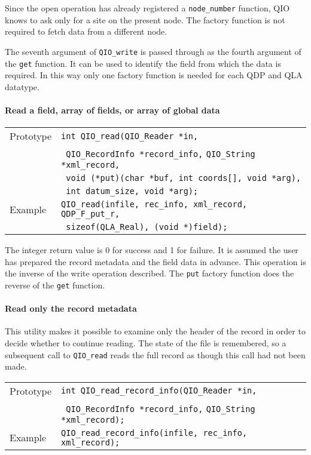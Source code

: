 \documentclass{article}
\newcommand{\QIOstring}{{\tt QIO\_String }}
\begin{document}
Since the open operation has already registered a \verb|node_number|
function, QIO knows to ask only for a site on the present node.  The
factory function is not required to fetch data from a different node.

The seventh argument of \verb|QIO_write| is passed through as the fourth
argument of the \verb|get| function.  It can be used to identify the
field from which the data is required.  In this way only one factory
function is needed for each QDP and QLA datatype.

\paragraph{Read a field, array of fields, or array of global data}

\begin{flushleft}
  \begin{tabular}{|l|l|}
  \hline
  Prototype      & \verb|int QIO_read(QIO_Reader *in,| \\
            & \verb| QIO_RecordInfo *record_info,| \QIOstring \verb|*xml_record, |\\
	    & \verb| void (*put)(char *buf, int coords[], void *arg), |\\
            & \verb| int datum_size, void *arg);| \\
\hline
  Example  & \verb|QIO_read(infile, rec_info, xml_record, QDP_F_put_r, |\\
           & \verb| sizeof(QLA_Real), (void *)field);|\\
   \hline
 \end{tabular}
\end{flushleft}
%
The integer return value is 0 for success and 1 for failure.  It is
assumed the user has prepared the record metadata and the field data
in advance.  This operation is the inverse of the write operation
described.  The \verb|put| factory function does the reverse of the
\verb|get| function.

\paragraph{Read only the record metadata}

This utility makes it possible to examine only the header of the
record in order to decide whether to continue reading.  The state of
the file is remembered, so a subsequent call to \verb|QIO_read| reads
the full record as though this call had not been made.
%
\begin{flushleft}
  \begin{tabular}{|l|l|}
  \hline
  Prototype      & \verb|int QIO_read_record_info(QIO_Reader *in,| \\
                 & \verb| QIO_RecordInfo *record_info,| \QIOstring \verb|*xml_record);| \\
\hline
  Example  & \verb|QIO_read_record_info(infile, rec_info, xml_record);|\\
   \hline
 \end{tabular}
\end{flushleft}
%
\end{document}
